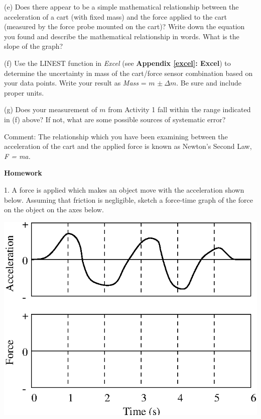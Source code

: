 (e) Does there appear to be a simple mathematical relationship between the acceleration of a cart (with fixed mass) and the force applied to the cart (measured by the force probe mounted on the cart)? Write down the equation you found and describe the mathematical relationship in words.  What is the slope of the graph?
\answerspace{20mm}

(f) Use the LINEST function in \textit{Excel} (see \textbf{Appendix \ref{excel}: Excel}) to determine the uncertainty in mass of the cart/force sensor combination based on your data points.  Write your result as \textit{Mass} = $m$ \( \pm \ \Delta  m\). Be sure and include proper units.
\answerspace{20mm}

(g) Does your measurement of $m$ from Activity 1 fall within the range indicated in (f) above? If not, what are some possible sources of systematic error?
\answerspace{20mm}

Comment: The relationship which you have been examining between the acceleration of the cart and the applied force is known as Newton's Second Law, \textit{F = ma.}

\pagebreak[2]
\textbf{Homework} 

1. A force is applied which makes an object move with the acceleration shown
below. Assuming that friction is negligible, sketch a force-time graph of the
force on the object on the axes below.

\vspace{0.3cm}
{\par\centering \includegraphics{force1/force1_fig6.eps} \par}
\vspace{0.3cm}

